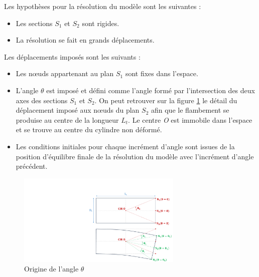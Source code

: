 Les hypothèses pour la résolution du modèle sont les suivantes :
\begin{itemize}[label=$\circ$]
\item Les sections $S_1$ et $S_2$ sont rigides.
\item La résolution se fait en grands déplacements.
\end{itemize} 
Les déplacements imposés sont les suivants :
\begin{itemize}[label=$\bullet$]
\item Les n\oe{}uds appartenant au plan $S_1$ sont fixes dans l'espace. 
\item L'angle $\theta$ est imposé et défini comme l'angle formé par l'intersection des deux axes des sections $S_1$ et $S_2$. On peut retrouver sur la figure \ref{fig:theta_impose} le détail du déplacement imposé aux n\oe{}uds du plan $S_2$ afin que le flambement se produise au centre de la longueur $L_t$. Le centre \emph{O} est immobile dans l'espace et se trouve au centre du cylindre non déformé.
\item Les conditions initiales pour chaque incrément d'angle sont issues de la position d'équilibre finale de la résolution du modèle avec l'incrément d'angle précédent.
\end{itemize}
\begin{figure}[!htbp]
\begin{center}
    \captionsetup{justification=centering}
	\includegraphics[trim={14.5cm 0cm 0cm 4cm},clip,width=0.7\textwidth]{../Chap5/Figure/theta_impose.pdf}
	\caption{Origine de l’angle $\theta$}
	\label{fig:theta_impose}
\end{center}	
\end{figure} 
